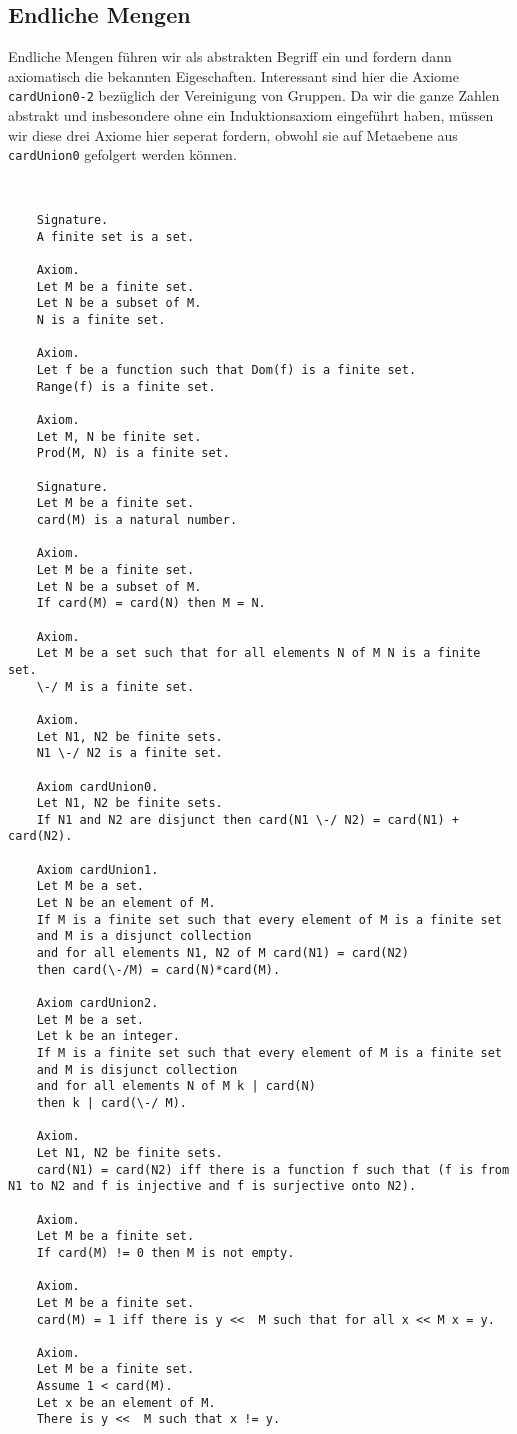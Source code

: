 \documentclass[a4paper,12pt]{scrartcl}
\begin{document}
\subsection{Endliche Mengen}

Endliche Mengen führen wir als abstrakten Begriff ein und fordern dann axiomatisch die bekannten Eigeschaften. Interessant sind hier die Axiome \verb!cardUnion0-2! bezüglich der Vereinigung von Gruppen. Da wir die ganze Zahlen abstrakt und insbesondere ohne ein Induktionsaxiom eingeführt haben, müssen wir diese drei Axiome hier seperat fordern, obwohl sie auf Metaebene aus \verb!cardUnion0! gefolgert werden können.

\begin{lstlisting}


	Signature.
	A finite set is a set.
	
	Axiom.
	Let M be a finite set.
	Let N be a subset of M.
	N is a finite set.
	
	Axiom.
	Let f be a function such that Dom(f) is a finite set.
	Range(f) is a finite set.
	
	Axiom.
	Let M, N be finite set.
	Prod(M, N) is a finite set.
	
	Signature.
	Let M be a finite set.
	card(M) is a natural number.
	
	Axiom.
	Let M be a finite set.
	Let N be a subset of M.
	If card(M) = card(N) then M = N.
	
	Axiom.
	Let M be a set such that for all elements N of M N is a finite set.
	\-/ M is a finite set.
	
	Axiom.
	Let N1, N2 be finite sets.
	N1 \-/ N2 is a finite set.
	
	Axiom cardUnion0.
	Let N1, N2 be finite sets.
	If N1 and N2 are disjunct then card(N1 \-/ N2) = card(N1) + card(N2).
	
	Axiom cardUnion1.
	Let M be a set.
	Let N be an element of M.
	If M is a finite set such that every element of M is a finite set
	and M is a disjunct collection 
	and for all elements N1, N2 of M card(N1) = card(N2)
	then card(\-/M) = card(N)*card(M).
	
	Axiom cardUnion2.
	Let M be a set.
	Let k be an integer.
	If M is a finite set such that every element of M is a finite set
	and M is disjunct collection
	and for all elements N of M k | card(N)
	then k | card(\-/ M).
	
	Axiom.
	Let N1, N2 be finite sets.
	card(N1) = card(N2) iff there is a function f such that (f is from N1 to N2 and f is injective and f is surjective onto N2).
	
	Axiom.
	Let M be a finite set.
	If card(M) != 0 then M is not empty.
	
	Axiom.
	Let M be a finite set.
	card(M) = 1 iff there is y <<  M such that for all x << M x = y.
	
	Axiom.
	Let M be a finite set.
	Assume 1 < card(M).
	Let x be an element of M.
	There is y <<  M such that x != y.

\end{lstlisting}
\end{document}
